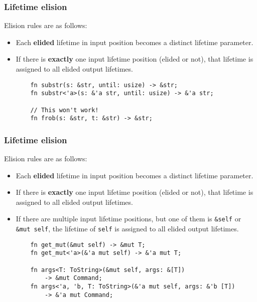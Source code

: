 \documentclass[aspectratio=1610,t]{beamer}
\begin{document}

\begin{frame}[fragile]
\frametitle{Lifetime elision}
Elision rules are as follows:

\begin{itemize}
    \item Each \textbf{elided} lifetime in input position becomes a distinct lifetime parameter.
    \item If there is \textbf{exactly} one input lifetime position (elided or not), that lifetime is assigned to all elided output lifetimes.
    
    \begin{verbatim}
    fn substr(s: &str, until: usize) -> &str;
    fn substr<'a>(s: &'a str, until: usize) -> &'a str;

    // This won't work!
    fn frob(s: &str, t: &str) -> &str;
    \end{verbatim}
\end{itemize}
\end{frame}


\begin{frame}[fragile]
\frametitle{Lifetime elision}
Elision rules are as follows:

\begin{itemize}
    \item Each \textbf{elided} lifetime in input position becomes a distinct lifetime parameter.
    \item If there is \textbf{exactly} one input lifetime position (elided or not), that lifetime is assigned to all elided output lifetimes.
    \item If there are multiple input lifetime positions, but one of them is \texttt{\&self} or \texttt{\&mut self}, the lifetime of \texttt{self} is assigned to all elided output lifetimes.
    
    \begin{verbatim}
    fn get_mut(&mut self) -> &mut T;
    fn get_mut<'a>(&'a mut self) -> &'a mut T;

    fn args<T: ToString>(&mut self, args: &[T])
        -> &mut Command;
    fn args<'a, 'b, T: ToString>(&'a mut self, args: &'b [T])
        -> &'a mut Command;
    \end{verbatim}
\end{itemize}
\end{frame}
\end{document}
